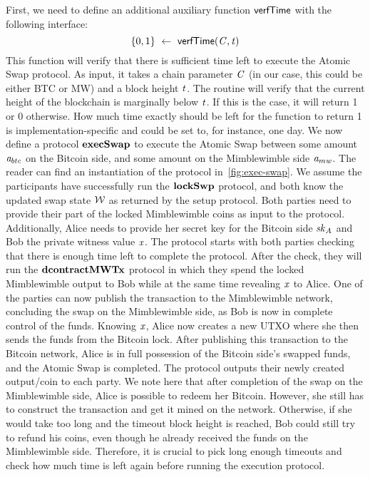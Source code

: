 First, we need to define an additional auxiliary function $\mathsf{verfTime}$ with the following interface:
\[ \{0,1\} ~\leftarrow~ \mathsf{verfTime} (\mathit{C},\mathit{t}) \]
This function will verify that there is sufficient time left to execute the Atomic Swap protocol.
As input, it takes a chain parameter $\mathit{C}$ (in our case, this could be either BTC or MW) and a block height $\mathit{t}$.
The routine will verify that the current height of the blockchain is marginally below $\mathit{t}$.
If this is the case, it will return 1 or 0 otherwise.
How much time exactly should be left for the function to return 1 is implementation-specific and could be set to, for instance, one day.
We now define a protocol $\mathbf{execSwap}$ to execute the Atomic Swap between some amount $\mathit{a}_{btc}$ on the Bitcoin side, and some amount on the Mimblewimble side $\mathit{a}_{mw}$.
The reader can find an instantiation of the protocol in~\cref{fig:exec-swap}.
We assume the participants have successfully run the $\mathbf{lockSwp}$ protocol, and both know the updated swap state $\mathcal{W}$ as returned by the setup protocol.
Both parties need to provide their part of the locked Mimblewimble coins as input to the protocol.
Additionally, Alice needs to provide her secret key for the Bitcoin side $\mathit{sk}_{\mathit{A}}$ and Bob the private witness value $\mathit{x}$.
The protocol starts with both parties checking that there is enough time left to complete the protocol.
After the check, they will run the $\mathbf{dcontractMWTx}$ protocol in which they spend the locked Mimblewimble output to Bob while at the same time revealing $\mathit{x}$ to Alice.
One of the parties can now publish the transaction to the Mimblewimble network, concluding the swap on the Mimblewimble side, as Bob is now in complete control of the funds.
Knowing $\mathit{x}$, Alice now creates a new UTXO where she then sends the funds from the Bitcoin lock.
After publishing this transaction to the Bitcoin network, Alice is in full possession of the Bitcoin side's swapped funds, and the Atomic Swap is completed.
The protocol outputs their newly created output/coin to each party.
We note here that after completion of the swap on the Mimblewimble side, Alice is possible to redeem her Bitcoin.
However, she still has to construct the transaction and get it mined on the network.
Otherwise, if she would take too long and the timeout block height is reached, Bob could still try to refund his coins, even though he already received the funds on the Mimblewimble side.
Therefore, it is crucial to pick long enough timeouts and check how much time is left again before running the execution protocol.


